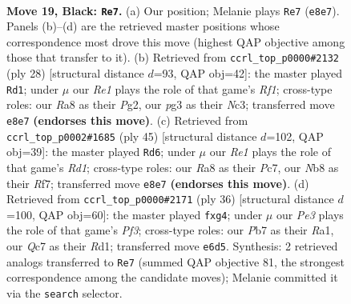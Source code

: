 \documentclass[11pt]{article}
\begin{document}
\clearpage

\begin{figure}[p]\centering
\begin{subfigure}{0.46\textwidth}\centering
\resizebox{\linewidth}{!}{%
\newchessgame
\chessboard[
  setfen={rn2r1k1/ppq3pp/4p3/P1bB4/7P/1N4P1/1P3P2/R1BQ1RK1 b - - 0 19},
  showmover=false,
  pgfstyle=straightmove, color=movearrow, markmove={e8-e7}
]}
\caption{}
\end{subfigure}\hfill
\begin{subfigure}{0.46\textwidth}\centering
\resizebox{\linewidth}{!}{%
\newchessgame
\chessboard[
  setfen={r1bq1rk1/pp1nbpp1/4p3/P3N3/3Q4/2N5/1P3PPP/R1B2RK1 w - - 1 15},
  showmover=false,
  pgfstyle=straightmove, color=movearrow, markmove={f1-d1}
]}
\caption{}
\end{subfigure}
\\[4pt]
\begin{subfigure}{0.46\textwidth}\centering
\resizebox{\linewidth}{!}{%
\newchessgame
\chessboard[
  setfen={3r4/2p2rpk/1p2q1np/3b1p2/8/2B1P2P/PQ1R1PP1/4RBK1 b - - 3 23},
  showmover=false,
  pgfstyle=straightmove, color=movearrow, markmove={d8-d6}
]}
\caption{}
\end{subfigure}\hfill
\begin{subfigure}{0.46\textwidth}\centering
\resizebox{\linewidth}{!}{%
\newchessgame
\chessboard[
  setfen={r2q1rk1/pp4bp/5pp1/2p1n3/3N2b1/2Q2PP1/PP4BP/R1BR2K1 w - - 0 19},
  showmover=false,
  pgfstyle=straightmove, color=movearrow, markmove={f3-g4}
]}
\caption{}
\end{subfigure}
\caption{\textbf{Move 19, Black: \texttt{Re7}.} (a) Our position; Melanie plays \texttt{Re7} (\texttt{e8e7}). Panels (b)--(d) are the retrieved master positions whose correspondence most drove this move (highest QAP objective among those that transfer to it). (b) Retrieved from \texttt{ccrl\_top\_p0000\#2132} (ply 28) [structural distance $d$=93, QAP obj=42]: the master played \texttt{Rd1}; under $\mu$ our \emph{Re1} plays the role of that game's \emph{Rf1}; cross-type roles: our \emph{R}a8 as their \emph{P}g2, our \emph{p}g3 as their \emph{N}c3; transferred move \texttt{e8e7} \textbf{(endorses this move)}. (c) Retrieved from \texttt{ccrl\_top\_p0002\#1685} (ply 45) [structural distance $d$=102, QAP obj=39]: the master played \texttt{Rd6}; under $\mu$ our \emph{Re1} plays the role of that game's \emph{Rd1}; cross-type roles: our \emph{R}a8 as their \emph{P}c7, our \emph{N}b8 as their \emph{R}f7; transferred move \texttt{e8e7} \textbf{(endorses this move)}. (d) Retrieved from \texttt{ccrl\_top\_p0000\#2171} (ply 36) [structural distance $d$=100, QAP obj=60]: the master played \texttt{fxg4}; under $\mu$ our \emph{Pe3} plays the role of that game's \emph{Pf3}; cross-type roles: our \emph{P}b7 as their \emph{R}a1, our \emph{Q}c7 as their \emph{R}d1; transferred move \texttt{e6d5}. Synthesis: 2 retrieved analogs transferred to \texttt{Re7} (summed QAP objective 81, the strongest correspondence among the candidate moves); Melanie committed it via the \texttt{search} selector.}
\label{fig:thought-m37}
\end{figure}
\end{document}
